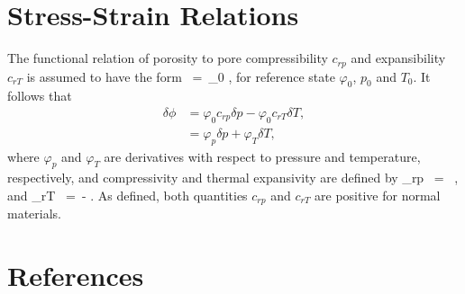 \documentclass[12pt]{article}
\def\EQ#1\EN{\begin{equation}#1\end{equation}}
\newcommand{\eq}{\ =\ }
\newcommand{\p}{{\partial}}
\begin{document}
\section{Stress-Strain Relations}

The functional relation of porosity to pore compressibility $c_{rp}$ and expansibility $c_{rT}$ is assumed to have the form
\EQ
\varphi \eq \varphi_{0} \big[1+c_{rp} (p-p_{0})-c_{rT} (T-T_{0})\big],
\EN
for reference state $\varphi_0$, $p_0$ and $T_0$. It follows that
\begin{align}\label{dpor}
\delta \phi &= \varphi_{0} c_{rp} \delta p - \varphi_{0} c_{rT} \delta T,\nonumber\\
&= \varphi_p \delta p + \varphi_T \delta T,
\end{align}
where $\varphi_p$ and $\varphi_T$ are derivatives with respect to pressure and temperature, respectively, and compressivity and thermal expansivity are defined by
\EQ
c_{rp} \eq {} \frac{\p \varphi}{\p p},
\EN
and
\EQ
c_{rT} \eq - \frac{\p \varphi}{\p T}.
\EN
As defined, both quantities $c_{rp}$ and $c_{rT}$ are positive for normal materials.

\section{References}
\end{document}
